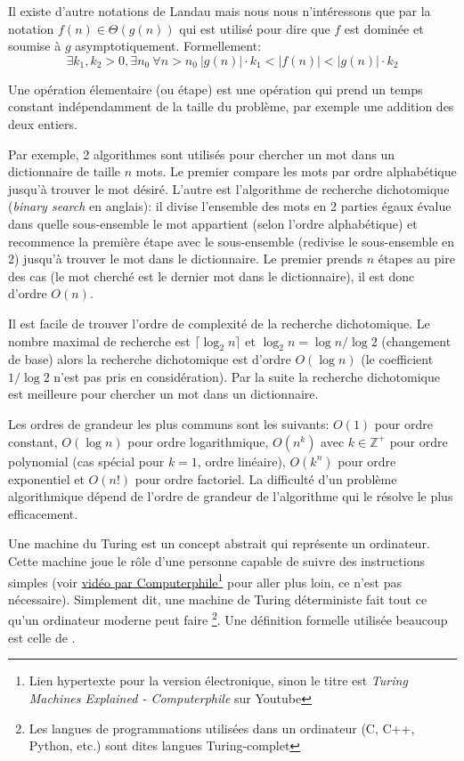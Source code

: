 \documentclass[../main.tex]{subfiles}
\begin{document}
Il existe d'autre notations de Landau mais nous nous n'intéressons que par la notation $f(n)\in \Theta (g(n))$ qui est utilisé pour dire que $f$ est dominée et soumise à $g$ asymptotiquement. Formellement:
\[
\exists k_1, k_2 > 0, \exists n_0 \ \forall n > n_0 \ |g(n)|\cdot k_1 < |f(n)| < |g(n)|\cdot k_2
\]

\begin{definition}
Une opération élementaire (ou étape) est une opération qui prend un temps constant indépendamment de la taille du problème, par exemple une addition des deux entiers.
\end{definition}

Par exemple, 2 algorithmes sont utilisés pour chercher un mot dans un dictionnaire de taille $n$ mots. Le premier compare les mots par ordre alphabétique jusqu'à trouver le mot désiré. L'autre est l'algorithme de recherche dichotomique (\emph{binary search} en anglais): il divise l'ensemble des mots en 2 parties égaux évalue dans quelle sous-ensemble le mot appartient (selon l'ordre alphabétique) et recommence la première étape avec le sous-ensemble (redivise le sous-ensemble en 2) jusqu'à trouver le mot dans le dictionnaire. Le premier prends $n$ étapes au pire des cas (le mot cherché est le dernier mot dans le dictionnaire), il est donc d'ordre $O(n)$.

Il est facile de trouver l'ordre de complexité de la recherche dichotomique. Le nombre maximal de recherche est $\lceil \log _2 n \rceil$ et $\log _2 n = \log n / \log 2$ (changement de base) alors la recherche dichotomique est d'ordre $O(\log n)$ (le coefficient $1/\log 2$ n'est pas pris en considération). Par la suite la recherche dichotomique est meilleure pour chercher un mot dans un dictionnaire.

Les ordres de grandeur les plus communs sont les suivants: $O(1)$ pour ordre constant, $O(\log n)$ pour ordre logarithmique, $O(n^k)$ avec $k \in \mathbb{Z}^+$ pour ordre polynomial (cas spécial pour $k=1$, ordre linéaire), $O(k^n)$ pour ordre exponentiel et $O(n!)$ pour ordre factoriel. La difficulté d'un problème algorithmique dépend de l'ordre de grandeur de l'algorithme qui le résolve le plus efficacement.

Une machine du Turing est un concept abstrait qui représente un ordinateur. Cette machine joue le rôle d'une personne capable de suivre des instructions simples (voir \href{https://www.youtube.com/watch?v=dNRDvLACg5Q}{vidéo par Computerphile}\footnote{Lien hypertexte pour la version électronique, sinon le titre est \emph{Turing Machines Explained - Computerphile} sur Youtube} pour aller plus loin, ce n'est pas nécessaire). Simplement dit, une machine de Turing déterministe fait tout ce qu'un ordinateur moderne peut faire \footnote{Les langues de programmations utilisées dans un ordinateur (C, C++, Python, etc.) sont dites langues Turing-complet}. Une définition formelle utilisée beaucoup est celle de \cite{Lewis1998}.
\end{document}
